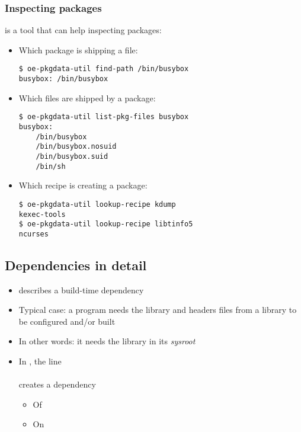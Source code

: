 \begin{frame}[fragile]
  \frametitle{Inspecting packages}
   is a tool that can help inspecting
  packages:
  \begin{itemize}
  \item Which package is shipping a file:
    \begin{block}{}
      \begin{verbatim}
$ oe-pkgdata-util find-path /bin/busybox
busybox: /bin/busybox
    \end{verbatim}
    \end{block}
  \item Which files are shipped by a package:
    \begin{block}{}
      \begin{verbatim}
$ oe-pkgdata-util list-pkg-files busybox
busybox:
    /bin/busybox
    /bin/busybox.nosuid
    /bin/busybox.suid
    /bin/sh
    \end{verbatim}
    \end{block}
  \item Which recipe is creating a package:
    \begin{block}{}
      \begin{verbatim}
$ oe-pkgdata-util lookup-recipe kdump
kexec-tools
$ oe-pkgdata-util lookup-recipe libtinfo5
ncurses
    \end{verbatim}
    \end{block}
\end{itemize}
\end{frame}

\subsection{Dependencies in detail}

\begin{frame}{}
  \begin{itemize}
    \item {} describes a build-time dependency
    \item Typical case: a program needs the library and headers files from
      a library to be configured and/or built
    \item In other words: it needs the library in its {\em sysroot}
    \item In , the line\\
      \\
      creates a dependency
      \begin{itemize}
        \item Of 
        \item On 
      \end{itemize}
  \end{itemize}
\end{frame}

